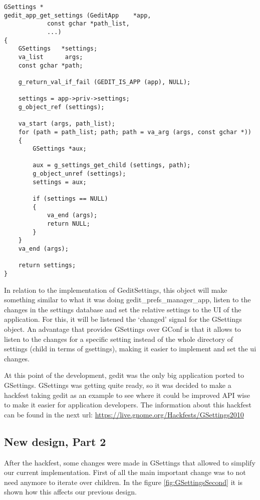 \begin{lstlisting}[style=GObject]
GSettings *
gedit_app_get_settings (GeditApp    *app,
			const gchar *path_list,
			...)
{
	GSettings   *settings;
	va_list      args;
	const gchar *path;

	g_return_val_if_fail (GEDIT_IS_APP (app), NULL);

	settings = app->priv->settings;
	g_object_ref (settings);

	va_start (args, path_list);
	for (path = path_list; path; path = va_arg (args, const gchar *))
	{
		GSettings *aux;

		aux = g_settings_get_child (settings, path);
		g_object_unref (settings);
		settings = aux;

		if (settings == NULL)
		{
			va_end (args);
			return NULL;
		}
	}
	va_end (args);

	return settings;
}
\end{lstlisting}

In relation to the implementation of GeditSettings, this object will make something similar to what it was doing gedit\_prefs\_manager\_app, listen to the changes in the settings database and set the relative settings to the UI of the application. For this, it will be listened the `changed' signal for the GSettings object. An advantage that provides GSettings over GConf is that it allows to listen to the changes for a specific setting instead of the whole directory of settings (child in terms of gsettings), making it easier to implement and set the ui changes.

At this point of the development, gedit was the only big application ported to GSettings. GSettings was getting quite ready, so it was decided to make a hackfest taking gedit as an example to see where it could be improved API wise to make it easier for application developers. The information about this hackfest can be found in the next url: \url{https://live.gnome.org/Hackfests/GSettings2010}

\newpage
\subsection{New design, Part 2}

After the hackfest, some changes were made in GSettings that allowed to simplify our current implementation. First of all the main important change was to not need anymore to iterate over children. In the figure \ref{fig:GSettingsSecond} it is shown how this affects our previous design.

